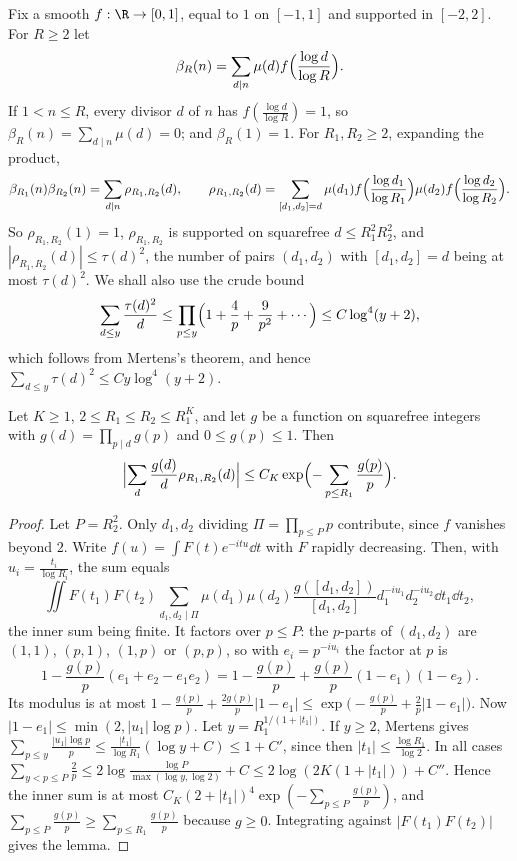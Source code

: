 Fix a smooth $f:\R\to[0,1]$, equal to $1$ on $[-1,1]$ and supported in $[-2,2]$. For $R\ge2$ let
\[
\beta_R(n)=\sum_{d\mid n}\mu(d)f\Bigl(\frac{\log d}{\log R}\Bigr).
\]
If $1<n\le R$, every divisor $d$ of $n$ has $f(\frac{\log d}{\log R})=1$, so $\beta_R(n)=\sum_{d\mid n}\mu(d)=0$; and $\beta_R(1)=1$. For $R_1,R_2\ge2$, expanding the product,
\[
\beta_{R_1}(n)\beta_{R_2}(n)=\sum_{d\mid n}\rho_{R_1,R_2}(d),\qquad\rho_{R_1,R_2}(d)=\sum_{[d_1,d_2]=d}\mu(d_1)f\Bigl(\frac{\log d_1}{\log R_1}\Bigr)\mu(d_2)f\Bigl(\frac{\log d_2}{\log R_2}\Bigr).
\]
So $\rho_{R_1,R_2}(1)=1$, $\rho_{R_1,R_2}$ is supported on squarefree $d\le R_1^2R_2^2$, and $|\rho_{R_1,R_2}(d)|\le\tau(d)^2$, the number of pairs $(d_1,d_2)$ with $[d_1,d_2]=d$ being at most $\tau(d)^2$. We shall also use the crude bound
\[
\sum_{d\le y}\frac{\tau(d)^2}d\le\prod_{p\le y}\Bigl(1+\frac4p+\frac9{p^2}+\cdots\Bigr)\le C\log^4(y+2),
\]
which follows from Mertens's theorem, and hence $\sum_{d\le y}\tau(d)^2\le Cy\log^4(y+2)$.

\begin{lemma}\label{lem:sievebound}
Let $K\ge1$, $2\le R_1\le R_2\le R_1^K$, and let $g$ be a function on squarefree integers with $g(d)=\prod_{p\mid d}g(p)$ and $0\le g(p)\le1$. Then
\[
\Bigl|\sum_d\frac{g(d)}d\rho_{R_1,R_2}(d)\Bigr|\le C_K\exp\Bigl(-\sum_{p\le R_1}\frac{g(p)}p\Bigr).
\]
\end{lemma}
\begin{proof}
Let $P=R_2^2$. Only $d_1,d_2$ dividing $\Pi=\prod_{p\le P}p$ contribute, since $f$ vanishes beyond $2$. Write $f(u)=\int F(t)e^{-itu}\dd t$ with $F$ rapidly decreasing. Then, with $u_i=\frac{t_i}{\log R_i}$, the sum equals
\[
\iint F(t_1)F(t_2)\sum_{d_1,d_2\mid\Pi}\mu(d_1)\mu(d_2)\frac{g([d_1,d_2])}{[d_1,d_2]}d_1^{-iu_1}d_2^{-iu_2}\dd t_1\dd t_2,
\]
the inner sum being finite. It factors over $p\le P$: the $p$-parts of $(d_1,d_2)$ are $(1,1)$, $(p,1)$, $(1,p)$ or $(p,p)$, so with $e_i=p^{-iu_i}$ the factor at $p$ is
\[
1-\frac{g(p)}p(e_1+e_2-e_1e_2)=1-\frac{g(p)}p+\frac{g(p)}p(1-e_1)(1-e_2).
\]
Its modulus is at most $1-\frac{g(p)}p+\frac{2g(p)}p|1-e_1|\le\exp\bigl(-\frac{g(p)}p+\frac2p|1-e_1|\bigr)$. Now $|1-e_1|\le\min(2,|u_1|\log p)$. Let $y=R_1^{1/(1+|t_1|)}$. If $y\ge2$, Mertens gives $\sum_{p\le y}\frac{|u_1|\log p}p\le\frac{|t_1|}{\log R_1}(\log y+C)\le1+C'$, since then $|t_1|\le\frac{\log R_1}{\log2}$. In all cases $\sum_{y<p\le P}\frac2p\le2\log\frac{\log P}{\max(\log y,\log 2)}+C\le2\log(2K(1+|t_1|))+C''$. Hence the inner sum is at most $C_K(2+|t_1|)^4\exp(-\sum_{p\le P}\frac{g(p)}p)$, and $\sum_{p\le P}\frac{g(p)}p\ge\sum_{p\le R_1}\frac{g(p)}p$ because $g\ge0$. Integrating against $|F(t_1)F(t_2)|$ gives the lemma.
\end{proof}

